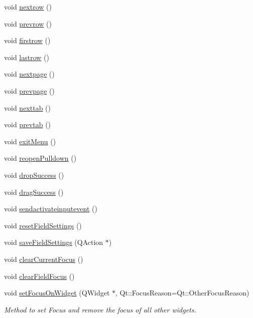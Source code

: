 \begin{DoxyCompactItemize}
\item 
void \hyperlink{classFglForm_a0321ef0bb745923607aecc90ff23dc16}{nextrow} ()
\item 
void \hyperlink{classFglForm_a92a335499ab7c95fa5b106f7a9f21e33}{prevrow} ()
\item 
void \hyperlink{classFglForm_af18f12d697d5a9fa0041c597d692d8f1}{firstrow} ()
\item 
void \hyperlink{classFglForm_adbc1aae701b9f9be093df1b60072ed10}{lastrow} ()
\item 
void \hyperlink{classFglForm_aafc9f7cacb9852d58b809a840abc104e}{nextpage} ()
\item 
void \hyperlink{classFglForm_ac3cf8e2f5bfc433cb19497e6bad4db0d}{prevpage} ()
\item 
void \hyperlink{classFglForm_a3f1ae54d6ef1585a6f14cf394758c09b}{nexttab} ()
\item 
void \hyperlink{classFglForm_a9eefd50c2b2dbcd9303a20a02a2ad140}{prevtab} ()
\item 
void \hyperlink{classFglForm_ac9689ad22eff52db3ab60446b78274e3}{exitMenu} ()
\item 
void \hyperlink{classFglForm_a267469fbb08f5d257f162df03b88852a}{reopenPulldown} ()
\item 
void \hyperlink{classFglForm_a0ccb7e3f717496c6dceaf34b0a6d49df}{dropSuccess} ()
\item 
void \hyperlink{classFglForm_a2a05aab413be356d8591d9feaa3818ea}{dragSuccess} ()
\item 
void \hyperlink{classFglForm_a6c13e4f1841a38f5cbf615595f88f78f}{sendactivateinputevent} ()
\item 
void \hyperlink{classFglForm_a1d7dad289a4b04321a2c932adf12d19b}{resetFieldSettings} ()
\item 
void \hyperlink{classFglForm_a3d7ccbba13b950e970333db68755d022}{saveFieldSettings} (QAction $\ast$)
\item 
void \hyperlink{classFglForm_a4430f1038e2dcfd957c1d361d0c286d4}{clearCurrentFocus} ()
\item 
void \hyperlink{classFglForm_ae2815f84a3c114c000f97cc0cf431bb7}{clearFieldFocus} ()
\item 
void \hyperlink{classFglForm_abacf589f219bcfbcf54ca2a5fb9ba859}{setFocusOnWidget} (QWidget $\ast$, Qt::FocusReason=Qt::OtherFocusReason)
\begin{DoxyCompactList}\small\item\em Method to set Focus and remove the focus of all other widgets. \item\end{DoxyCompactList}\item 

\end{DoxyCompactItemize}
